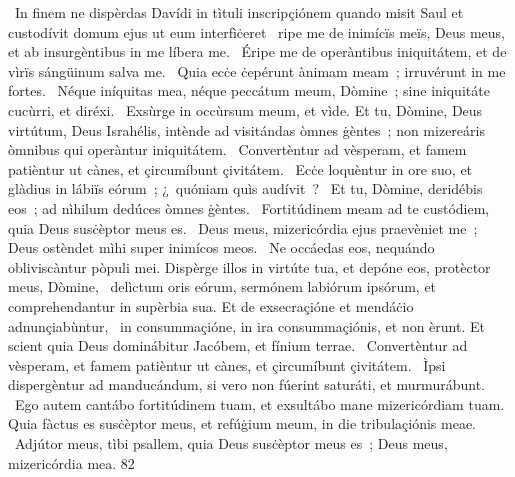 {~In finem ne dispèrdas Davídi in tìtuli inscripçiónem quando misit Saul et custodívit domum ejus ut eum interfìċeret}
{%
~ripe me de inimícïs meïs, Deus meus, et ab insurgèntibus in me líbera me.
~Éripe me de operàntibus iniquitátem, et de vìrïs sángüinum salva me.
~Quia ecċe ċepérunt ànimam meam~; irruvérunt in me fortes.
~Néque iníquitas mea, néque peccátum meum, Dòmine~; sine iniquitáte cucùrri, et diréxi.
~Exsùrge in occùrsum meum, et vìde. Et tu, Dòmine, Deus virtútum, Deus Israhélis, intènde ad visitándas òmnes ġèntes~; non mizereáris òmnibus qui operàntur iniquitátem.
~Convertèntur ad vèsperam, et famem patièntur ut cànes, et çircumíbunt çivitátem.
~Ecċe loquèntur in ore suo, et glàdius in lábiïs eórum~; ¿~quóniam quìs audívit~?
~Et tu, Dòmine, deridébis eos~; ad nìhilum dedúces òmnes ġèntes.
~Fortitúdinem meam ad te custódiem, quia Deus susċèptor meus es.
~Deus meus, mizericórdia ejus praevèniet me~; Deus ostèndet mìhi super inimícos meos.
~Ne occáedas eos, nequándo obliviscàntur pòpuli mei. Dispèrge illos in virtúte tua, et depóne eos, protèctor meus, Dòmine,
~delìctum oris eórum, sermónem labiórum ipsórum, et comprehendantur in supèrbia sua. Et de exsecraçióne et mendáċio adnunçiabùntur,
~in consummaçióne, in ira consummaçiónis, et non èrunt. Et scient quia Deus dominábitur Jacóbem, et fínium terrae.
~Convertèntur ad vèsperam, et famem patièntur ut cànes, et çircumíbunt çivitátem.
~Ìpsi dispergèntur ad manducándum, si vero non fúerint saturáti, et murmurábunt.
~Ego autem cantábo fortitúdinem tuam, et exsultábo mane mizericórdiam tuam. Quia fàctus es susċèptor meus, et refúġium meum, in die tribulaçiónis meae.
~Adjútor meus, tìbi psallem, quia Deus susċèptor meus es~; Deus meus, mizericórdia mea.}
{8}{2}
